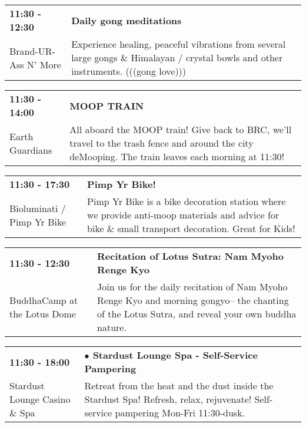 \begin{tabular}{ p{1in} p{2.2in} }
    \textbf{11:30 - 12:30} & \textbf{Daily gong meditations} \\
    Brand-UR-Ass N' More \newline  & Experience healing, peaceful vibrations from several large gongs \& Himalayan / crystal bowls and other instruments. (((gong love))) \\
    \hline 
\end{tabular}
    
\begin{tabular}{ p{1in} p{2.2in} }
    \textbf{11:30 - 14:00} & \textbf{MOOP TRAIN } \\
    Earth Guardians \newline  & All aboard the MOOP train! Give back to BRC, we'll travel to the trash fence and around the city deMooping. The train leaves each morning at 11:30! \\
    \hline 
\end{tabular}
    
\begin{tabular}{ p{1in} p{2.2in} }
    \textbf{11:30 - 17:30} & \textbf{Pimp Yr Bike!} \\
    Bioluminati / Pimp Yr Bike \newline  & Pimp Yr Bike is a bike decoration station where we provide anti-moop materials and advice for bike \& small transport decoration. Great for Kids! \\
    \hline 
\end{tabular}
    
\begin{tabular}{ p{1in} p{2.2in} }
    \textbf{11:30 - 12:30} & \textbf{Recitation of Lotus Sutra: Nam Myoho Renge Kyo} \\
    BuddhaCamp at the Lotus Dome \newline  & Join us for the daily recitation of Nam Myoho Renge Kyo and morning gongyo-- the chanting of the Lotus Sutra, and reveal your own buddha nature. \\
    \hline 
\end{tabular}
    
\begin{tabular}{ p{1in} p{2.2in} }
    \textbf{11:30 - 18:00} & \textbf{$\bullet$	Stardust Lounge Spa - Self-Service Pampering} \\
    Stardust Lounge Casino \& Spa \newline  & Retreat from the heat and the dust inside the Stardust Spa! Refresh, relax, rejuvenate! Self-service pampering Mon-Fri 11:30-dusk. \\
    \hline 
\end{tabular}
    
